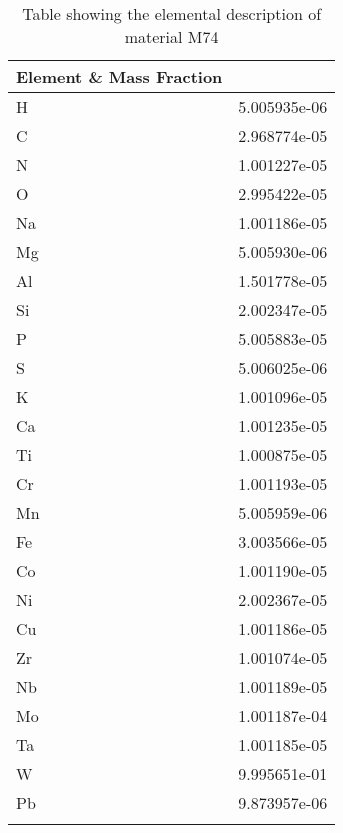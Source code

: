 \begin{centering}
\begin{longtable}[ht!]
  { p{} | p{} }
\hline
Element \& Mass Fraction\\
\hline
H &  5.005935e-06\\
C &  2.968774e-05\\
N &  1.001227e-05\\
O &  2.995422e-05\\
Na &  1.001186e-05\\
Mg &  5.005930e-06\\
Al &  1.501778e-05\\
Si &  2.002347e-05\\
P &  5.005883e-05\\
S &  5.006025e-06\\
K &  1.001096e-05\\
Ca &  1.001235e-05\\
Ti &  1.000875e-05\\
Cr &  1.001193e-05\\
Mn &  5.005959e-06\\
Fe &  3.003566e-05\\
Co &  1.001190e-05\\
Ni &  2.002367e-05\\
Cu &  1.001186e-05\\
Zr &  1.001074e-05\\
Nb &  1.001189e-05\\
Mo &  1.001187e-04\\
Ta &  1.001185e-05\\
W &  9.995651e-01\\
Pb &  9.873957e-06\\
\caption{Table showing the elemental description of material M74}
\label{table:material_M74}
\end{longtable}
\clearpage


\end{centering}
